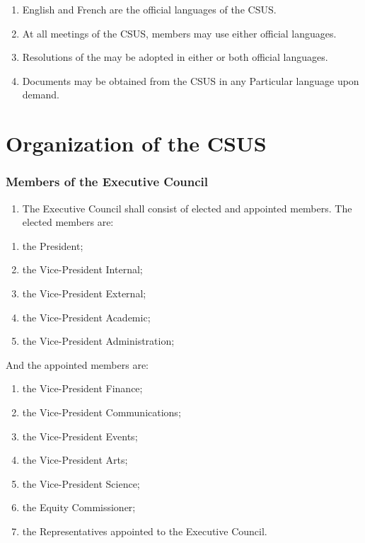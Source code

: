 \begin{enumerate}
\def\labelenumi{\arabic{enumi}.}
\tightlist
\item
  English and French are the official languages of the CSUS.
\item
  At all meetings of the CSUS, members may use either official
  languages.
\item
  Resolutions of the may be adopted in either or both official
  languages.
\item
  Documents may be obtained from the CSUS in any Particular language
  upon demand.
\end{enumerate}

\part{Organization of the
CSUS}\label{organization-of-the-csus}

\section{Members of the Executive
Council}\label{members-of-the-executive-council}

\begin{enumerate}
\def\labelenumi{\arabic{enumi}.}
\tightlist
\item
  The Executive Council shall consist of elected and appointed members.
  The elected members are:
\end{enumerate}

\begin{enumerate}
\def\labelenumi{(\alph{enumi})}
\item
  the President;
\item
  the Vice-President Internal;
\item
  the Vice-President External;
\item
  the Vice-President Academic;
\item
  the Vice-President Administration;
\end{enumerate}

  And the appointed members are: 

\begin{enumerate}
\def\labelenumi{(\alph{enumi})}
\setcounter{enumi}{5}
\item
  the Vice-President Finance;
\item
  the Vice-President Communications;
\item
  the Vice-President Events;
\item
  the Vice-President Arts;
\item
  the Vice-President Science;
\item
  the Equity Commissioner;
\item
  the Representatives appointed to the Executive Council.
\end{enumerate}

